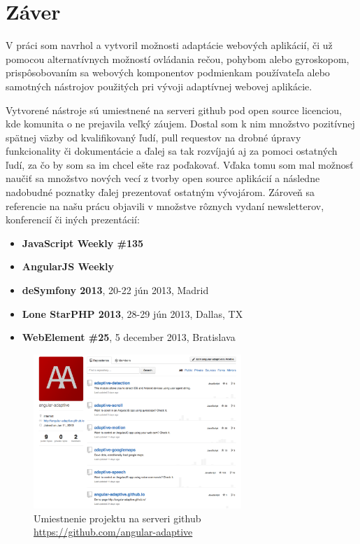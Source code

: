 



\newpage
\section{Záver} %
\label{sec:z_ver}

V práci som navrhol a vytvoril možnosti adaptácie webových aplikácií, či už pomocou alternatívnych možností ovládania rečou, pohybom alebo gyroskopom, prispôsobovaním sa webových komponentov podmienkam používateľa alebo samotných nástrojov použitých pri vývoji adaptívnej webovej aplikácie.

Vytvorené nástroje sú umiestnené na serveri github pod open source licenciou, kde komunita o ne prejavila veľký záujem. Dostal som k nim množstvo pozitívnej spätnej väzby od kvalifikovaný ľudí, pull requestov na drobné úpravy funkcionality či dokumentácie a ďalej sa tak rozvíjajú aj za pomoci ostatných ľudí, za čo by som sa im chcel ešte raz poďakovať. Vďaka tomu som mal možnosť naučiť sa množstvo nových vecí z tvorby open source aplikácií a následne nadobudné poznatky ďalej prezentovať ostatným vývojárom. Zároveň sa referencie na našu prácu objavili v množstve rôznych vydaní newsletterov, konferencií či iných prezentácií:

\begin{itemize}
  \item \textbf{JavaScript Weekly \#135}
  \item \textbf{AngularJS Weekly}
  \item \textbf{deSymfony 2013}, 20-22 jún 2013, Madrid
  \item \textbf{Lone StarPHP 2013}, 28-29 jún 2013, Dallas, TX
  \item \textbf{WebElement \#25}, 5 december 2013, Bratislava
\end{itemize}

\begin{figure}[H]
  \centering
  \includegraphics[width=0.7\textwidth]{img/github.png}
  \caption[Umiestnenie projektu na serveri github]{
    Umiestnenie projektu na serveri github\\
    \url{https://github.com/angular-adaptive}}
  \label{fig: github}
\end{figure}

